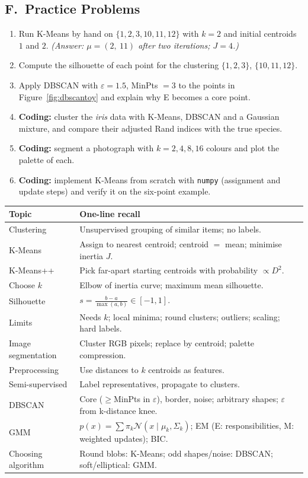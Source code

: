 \subsection*{F.\ Practice Problems}
\begin{enumerate}
  \item Run K-Means by hand on $\{1,2,3,10,11,12\}$ with $k=2$ and initial centroids $1$ and $2$. \textit{(Answer: $\mu=(2,\ 11)$ after two iterations; $J=4$.)}
  \item Compute the silhouette of each point for the clustering $\{1,2,3\}$, $\{10,11,12\}$.
  \item Apply DBSCAN with $\varepsilon=1.5$, MinPts $=3$ to the points in Figure~\ref{fig:dbscantoy} and explain why E becomes a core point.
  \item \textbf{Coding:} cluster the \emph{iris} data with K-Means, DBSCAN and a Gaussian mixture, and compare their adjusted Rand indices with the true species.
  \item \textbf{Coding:} segment a photograph with $k=2,4,8,16$ colours and plot the palette of each.
  \item \textbf{Coding:} implement K-Means from scratch with \texttt{numpy} (assignment and update steps) and verify it on the six-point example.
\end{enumerate}

\begin{revision}
\begin{center}\small
\begin{tabular}{@{}p{3.6cm}p{9.6cm}@{}}
\toprule
\textbf{Topic} & \textbf{One-line recall}\\
\midrule
Clustering & Unsupervised grouping of similar items; no labels.\\
K-Means & Assign to nearest centroid; centroid $=$ mean; minimise inertia $J$.\\
K-Means++ & Pick far-apart starting centroids with probability $\propto D^2$.\\
Choose $k$ & Elbow of inertia curve; maximum mean silhouette.\\
Silhouette & $s=\frac{b-a}{\max(a,b)}\in[-1,1]$.\\
Limits & Needs $k$; local minima; round clusters; outliers; scaling; hard labels.\\
Image segmentation & Cluster RGB pixels; replace by centroid; palette compression.\\
Preprocessing & Use distances to $k$ centroids as features.\\
Semi-supervised & Label representatives, propagate to clusters.\\
DBSCAN & Core ($\ge$MinPts in $\varepsilon$), border, noise; arbitrary shapes; $\varepsilon$ from k-distance knee.\\
GMM & $p(x)=\sum\pi_k\mathcal N(x\mid\mu_k,\Sigma_k)$; EM (E: responsibilities, M: weighted updates); BIC.\\
Choosing algorithm & Round blobs: K-Means; odd shapes/noise: DBSCAN; soft/elliptical: GMM.\\
\bottomrule
\end{tabular}
\end{center}
\end{revision}
